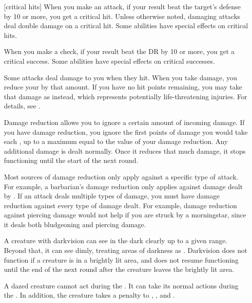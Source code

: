 [critical hits] When you make an attack, if your result beat the target's defense by 10 or more, you get a critical hit.
Unless otherwise noted, damaging attacks deal double damage on a critical hit.
Some abilities have special effects on critical hits.

 When you make a check, if your result beat the DR by 10 or more, you get a critical success.
Some abilities have special effects on critical successes.

 Some attacks deal damage to you when they hit.
When you take damage, you reduce your  by that amount.
If you have no hit points remaining, you may take that damage as  instead, which represents potentially life-threatening injuries.
For details, see .

 Damage reduction allows you to ignore a certain amount of incoming damage.
If you have damage reduction, you ignore the first points of damage you would take each , up to a maximum equal to the value of your damage reduction.
Any additional damage is dealt normally.
Once it reduces that much damage, it stops functioning until the start of the next round.

Most sources of damage reduction only apply against a specific type of attack.
For example, a barbarian's damage reduction only applies against damage dealt by .
If an attack deals multiple types of damage, you must have damage reduction against every type of damage dealt.
For example, damage reduction against piercing damage would not help if you are struck by a morningstar, since it deals both bludgeoning and piercing damage.

 A creature with darkvision can see in the dark clearly up to a given range.
Beyond that, it can see dimly, treating areas of darkness as .
Darkvision does not function if a creature is in a brightly lit area, and does not resume functioning until the end of the next round after the creature leaves the brightly lit area.

 A dazed creature cannot act during the .
It can take its normal actions during the .
In addition, the creature takes a  penalty to , , and .

